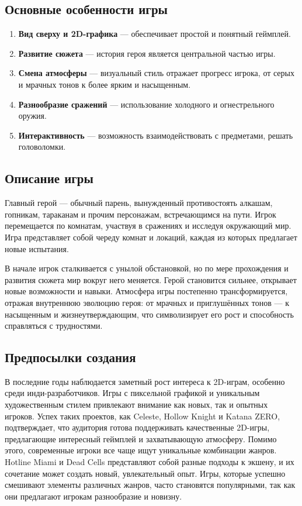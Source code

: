 \documentclass[12pt]{article}
\begin{document}
    \subsection{Основные особенности игры}
    \begin{enumerate}
    \item \textbf{Вид сверху и 2D-графика} — обеспечивает простой и понятный геймплей.
    \item \textbf{Развитие сюжета} — история героя является центральной частью игры.
    \item \textbf{Смена атмосферы} — визуальный стиль отражает прогресс игрока, от серых и мрачных тонов к более ярким и насыщенным.
    \item \textbf{Разнообразие сражений} — использование холодного и огнестрельного оружия.
    \item \textbf{Интерактивность} — возможность взаимодействовать с предметами, решать головоломки.
\end{enumerate}
    \subsection{Описание игры}
    Главный герой — обычный парень, вынужденный противостоять алкашам, гопникам, тараканам и прочим персонажам, встречающимся на пути. Игрок перемещается по комнатам, участвуя в сражениях и исследуя окружающий мир. Игра представляет собой череду комнат и локаций, каждая из которых предлагает новые испытания.

    В начале игрок сталкивается с унылой обстановкой, но по мере прохождения и развития сюжета мир вокруг него меняется. Герой становится сильнее, открывает новые возможности и навыки. Атмосфера игры постепенно трансформируется, отражая внутреннюю эволюцию героя: от мрачных и приглушённых тонов — к насыщенным и жизнеутверждающим, что символизирует его рост и способность справляться с трудностями.
    \subsection{Предпосылки создания}
    \setlength{\parindent}{1.5em}В последние годы наблюдается заметный рост интереса к 2D-играм, особенно среди инди-разработчиков. Игры с пиксельной графикой и уникальным художественным стилем привлекают внимание как новых, так и опытных игроков. Успех таких проектов, как Celeste, Hollow Knight и Katana ZERO, подтверждает, что аудитория готова поддерживать качественные 2D-игры, предлагающие интересный геймплей и захватывающую атмосферу. Помимо этого, современные игроки все чаще ищут уникальные комбинации жанров. Hotline Miami и Dead Cells представляют собой разные подходы к экшену, и их сочетание может создать новый, увлекательный опыт. Игры, которые успешно смешивают элементы различных жанров, часто становятся популярными, так как они предлагают игрокам разнообразие и новизну.
    
\end{document}
